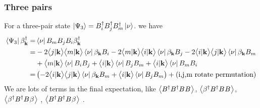\subsubsection{Three pairs}
For a three-pair state $\ket{\Psi_3}=B^\dg_i{}B^\dg_j{}B^\dg_m\ket{\nu}$. 
we have 
\begin{equation}
\begin{split}
 \bra{\Psi_3}\beta^\dg_\vk=&\bra{\nu}B_m{}B_j{}B_i\beta^\dg_\vk\\
=&-2\avt{j}{\vk}\avt{m}{\vk}\bra{\nu}\beta_\vk{}B_i-2\avt{m}{\vk}\avt{i}{\vk}\bra{\nu}\beta_\vk{}B_j
-2\avt{i}{\vk}\avt{j}{\vk}\bra{\nu}\beta_\vk{}B_m\\
&+\avt{m}{\vk}\bra{\nu}B_i{}B_j+\avt{i}{\vk}\bra{\nu}B_j{}B_m+\avt{i}{\vk}\bra{\nu}B_m{}B_i\\
=&\br{-2\avt{i}{\vk}\avt{j}{\vk}\bra{\nu}\beta_\vk{}B_m+\avt{i}{\vk}\bra{\nu}B_j{}B_m}+(\mbox{i,j,m rotate permutation})
\end{split}
\end{equation}
We are lots of terms in the final expectation, like $\av{B^\dg{}B^\dg{}B^{}B^{}}$, $\av{\beta^\dg{}B^\dg{}B^{}B^{}}$,$\av{\beta^\dg{}B^\dg{}B^{}\beta^{}}$ , $\av{B^\dg{}B^\dg{}B^{}\beta^{}}$ .  